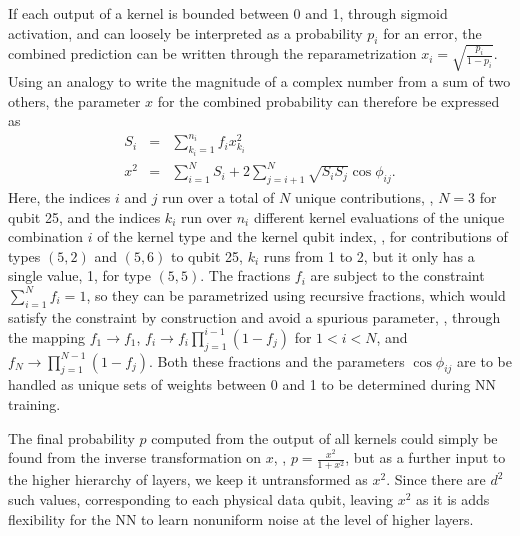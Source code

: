 If each output of a kernel is bounded between 0 and 1, through sigmoid activation, and can loosely be interpreted as a probability $p_i$ for an error, the combined prediction can be written through the reparametrization $x_i=\sqrt{\frac{p_i}{1-p_i}}$. Using an analogy to write the magnitude of a complex number from a sum of two others, the parameter $x$ for the combined probability can therefore be expressed as
\begin{eqnarray}
S_i &=& \sum_{k_i=1}^{n_i} f_i x^2_{k_i} \\
x^2 &=& \sum_{i=1}^{N} S_i + 2 \sum_{j=i+1}^{N} \sqrt{S_i S_j} \cos{\phi_{ij}}.
\label{eq:kernsum}
\end{eqnarray}
Here, the indices $i$ and $j$ run over a total of $N$ unique contributions, \eg, $N=3$ for qubit 25, and the indices $k_i$ run over $n_i$ different kernel evaluations of the unique combination $i$ of the kernel type and the kernel qubit index, \eg, for contributions of types $(5,2)$ and $(5,6)$ to qubit 25, $k_i$ runs from 1 to 2, but it only has a single value, 1, for type $(5,5)$.
The fractions $f_i$ are subject to the constraint $\sum_{i=1}^{N} f_i = 1$, so they can be parametrized using recursive fractions, which would satisfy the constraint by construction and avoid a spurious parameter, \ie, through the mapping $f_1 \to f_1$, $f_i \to f_i\prod_{j=1}^{i-1}\left(1-f_j\right)$ for $1<i<N$, and $f_N \to \prod_{j=1}^{N-1}\left(1-f_j\right)$. Both these fractions and the parameters $\cos{\phi_{ij}}$ are to be handled as unique sets of weights between 0 and 1 to be determined during NN training.

The final probability $p$ computed from the output of all kernels could simply be found from the inverse transformation on $x$, \ie, $p=\frac{x^2}{1+x^2}$, but as a further input to the higher hierarchy of layers, we keep it untransformed as $x^2$. Since there are $d^2$ such values, corresponding to each physical data qubit, leaving $x^2$ as it is adds flexibility for the NN to learn nonuniform noise at the level of higher layers.




